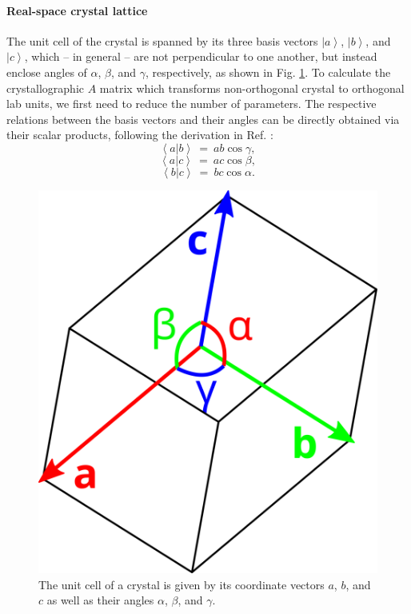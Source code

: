 \paragraph{Real-space crystal lattice}
The unit cell of the crystal is spanned by its three basis vectors $\left| a \right>$, $\left| b \right>$, and $\left| c \right>$, 
which -- in general -- are not perpendicular to one another, but instead enclose angles of $\alpha$, $\beta$, 
and $\gamma$, respectively, as shown in Fig. \ref{fig:cell}. 
To calculate the crystallographic $A$ matrix which transforms non-orthogonal crystal to orthogonal lab units, 
we first need to reduce the number of parameters.
The respective relations between the basis vectors and their angles can be directly obtained via
their scalar products, following the derivation in Ref. \cite{wiki_fractional}:
\begin{equation} \left< a | b \right > \ =\  ab \cos \gamma, \label{ab} \end{equation}
\begin{equation} \left< a | c \right > \ =\  ac \cos \beta, \label{ac} \end{equation}
\begin{equation} \left< b | c \right > \ =\  bc \cos \alpha. \label{bc} \end{equation}

\begin{figure}
	\centering
	\includegraphics[width = 0.2 \textwidth]{figures/cell}
	\caption[Crystal unit cell.]{
		The unit cell of a crystal is given by its coordinate vectors $a$, $b$, and $c$ 
		as well as their angles $\alpha$, $\beta$, and $\gamma$.}
	\label{fig:cell}
\end{figure}



